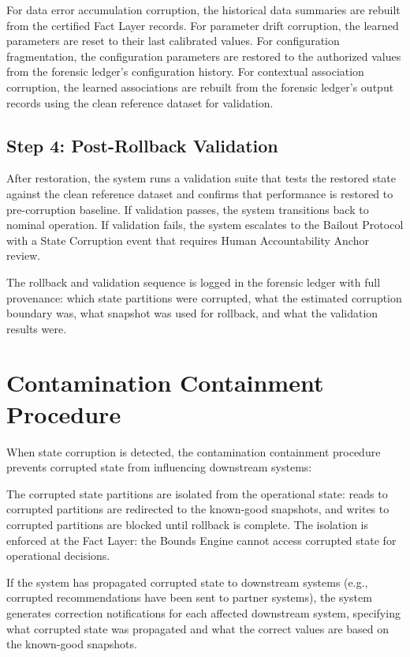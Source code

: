 \documentclass[12pt]{article}
\begin{document}
For data error accumulation corruption, the historical data summaries are rebuilt from the certified Fact Layer records. For parameter drift corruption, the learned parameters are reset to their last calibrated values. For configuration fragmentation, the configuration parameters are restored to the authorized values from the forensic ledger's configuration history. For contextual association corruption, the learned associations are rebuilt from the forensic ledger's output records using the clean reference dataset for validation.

\subsection{Step 4: Post-Rollback Validation}
After restoration, the system runs a validation suite that tests the restored state against the clean reference dataset and confirms that performance is restored to pre-corruption baseline. If validation passes, the system transitions back to nominal operation. If validation fails, the system escalates to the Bailout Protocol with a State Corruption event that requires Human Accountability Anchor review.

The rollback and validation sequence is logged in the forensic ledger with full provenance: which state partitions were corrupted, what the estimated corruption boundary was, what snapshot was used for rollback, and what the validation results were.

\section{Contamination Containment Procedure}
When state corruption is detected, the contamination containment procedure prevents corrupted state from influencing downstream systems:

The corrupted state partitions are isolated from the operational state: reads to corrupted partitions are redirected to the known-good snapshots, and writes to corrupted partitions are blocked until rollback is complete. The isolation is enforced at the Fact Layer: the Bounds Engine cannot access corrupted state for operational decisions.

If the system has propagated corrupted state to downstream systems (e.g., corrupted recommendations have been sent to partner systems), the system generates correction notifications for each affected downstream system, specifying what corrupted state was propagated and what the correct values are based on the known-good snapshots.
\end{document}

